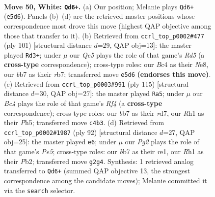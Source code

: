 \documentclass[11pt]{article}
\begin{document}
\clearpage

\begin{figure}[p]\centering
\begin{subfigure}{0.46\textwidth}\centering
\resizebox{\linewidth}{!}{%
\newchessgame
\chessboard[
  setfen={3k1r2/1b6/8/4Q3/2B5/7P/1p4P1/6KR w - - 9 50},
  showmover=false,
  pgfstyle=straightmove, color=movearrow, markmove={e5-d6}
]}
\caption{}
\end{subfigure}\hfill
\begin{subfigure}{0.46\textwidth}\centering
\resizebox{\linewidth}{!}{%
\newchessgame
\chessboard[
  setfen={4n3/1R4p1/8/7P/k2r4/p6K/B4P2/8 b - - 9 51},
  showmover=false,
  pgfstyle=straightmove, color=movearrow, markmove={d4-d3}
]}
\caption{}
\end{subfigure}
\\[4pt]
\begin{subfigure}{0.46\textwidth}\centering
\resizebox{\linewidth}{!}{%
\newchessgame
\chessboard[
  setfen={8/P2R2pk/8/5r1p/8/5bB1/8/6K1 b - - 2 58},
  showmover=false,
  pgfstyle=straightmove, color=movearrow, markmove={f5-a5}
]}
\caption{}
\end{subfigure}\hfill
\begin{subfigure}{0.46\textwidth}\centering
\resizebox{\linewidth}{!}{%
\newchessgame
\chessboard[
  setfen={8/2k2B2/7p/p1b1P3/8/8/KP5R/4r3 w - - 4 47},
  showmover=false,
  pgfstyle=straightmove, color=movearrow, markmove={e5-e6}
]}
\caption{}
\end{subfigure}
\caption{\textbf{Move 50, White: \texttt{Qd6+}.} (a) Our position; Melanie plays \texttt{Qd6+} (\texttt{e5d6}). Panels (b)--(d) are the retrieved master positions whose correspondence most drove this move (highest QAP objective among those that transfer to it). (b) Retrieved from \texttt{ccrl\_top\_p0002\#477} (ply 101) [structural distance $d$=29, QAP obj=13]: the master played \texttt{Rd3+}; under $\mu$ our \emph{Qe5} plays the role of that game's \emph{Rd5} (a \textbf{cross-type} correspondence); cross-type roles: our \emph{B}c4 as their \emph{N}e8, our \emph{b}b7 as their \emph{r}b7; transferred move \texttt{e5d6} \textbf{(endorses this move)}. (c) Retrieved from \texttt{ccrl\_top\_p0003\#991} (ply 115) [structural distance $d$=30, QAP obj=27]: the master played \texttt{Ra5}; under $\mu$ our \emph{Bc4} plays the role of that game's \emph{Rf4} (a \textbf{cross-type} correspondence); cross-type roles: our \emph{b}b7 as their \emph{r}d7, our \emph{R}h1 as their \emph{P}h5; transferred move \texttt{c4b3}. (d) Retrieved from \texttt{ccrl\_top\_p0002\#1987} (ply 92) [structural distance $d$=27, QAP obj=25]: the master played \texttt{e6}; under $\mu$ our \emph{Pg2} plays the role of that game's \emph{Pe5}; cross-type roles: our \emph{b}b7 as their \emph{r}e1, our \emph{R}h1 as their \emph{P}b2; transferred move \texttt{g2g4}. Synthesis: 1 retrieved analog transferred to \texttt{Qd6+} (summed QAP objective 13, the strongest correspondence among the candidate moves); Melanie committed it via the \texttt{search} selector.}
\label{fig:thought-m98}
\end{figure}
\end{document}
